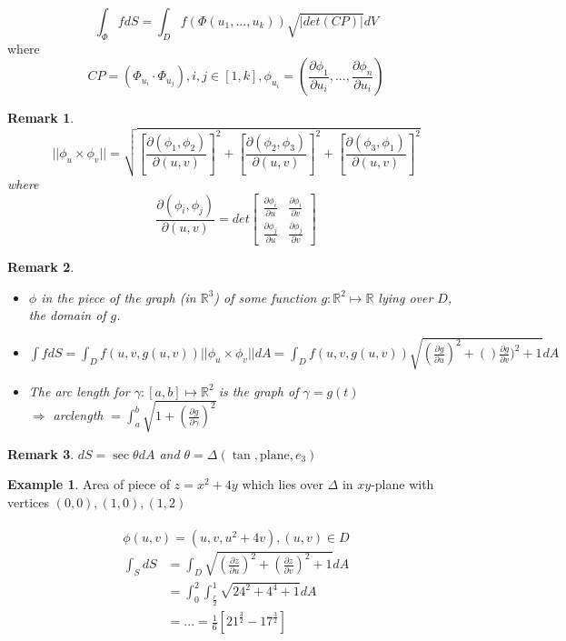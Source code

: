 \documentclass[12pt]{article}
\theoremstyle{plain}
\newtheorem*{remark}{Remark}
\theoremstyle{definition}
\newtheorem{example}[theorem]{Example}
\begin{document}
$$\int_\Phi f dS = \int_D f(\Phi (u_1,...,u_k)) \sqrt{|det(CP)|} dV$$
where
$$CP = (\Phi_{u_i} \cdot \Phi_{u_j}), i,j \in [1,k], \phi_{u_i} = (\frac{\partial \phi_1}{\partial u_i}, ..., \frac{\partial \phi_n}{\partial u_i})$$

\begin{remark}
	$$||\phi_u \times \phi_v|| = \sqrt{[\frac{\partial (\phi_1, \phi_2)}{\partial (u,v)}]^2 + [\frac{\partial (\phi_2, \phi_3)}{\partial (u,v)}]^2 + [\frac{\partial (\phi_3, \phi_1)}{\partial (u,v)}]^2}$$
	where
	$$\frac{\partial (\phi_i, \phi_j)}{\partial (u,v)} = det\begin{bmatrix}
	\frac{\partial \phi_i}{\partial u} & \frac{\partial \phi_i}{\partial v} \\
	\frac{\partial \phi_j}{\partial u} & \frac{\partial \phi_j}{\partial v}
	\end{bmatrix}$$
\end{remark}

\begin{remark}
	\begin{itemize}
		\item{$\phi$ in the piece of the graph (in $\mathbb{R}^3$) of some function $g:\mathbb{R}^2\mapsto \mathbb{R}$ lying over $D$, the domain of $g$.}
		\item{$\int f dS = \int_D f(u,v,g(u,v))||\phi_u \times \phi_v||dA = \int_D f(u,v,g(u,v)) \sqrt{(\frac{\partial g}{\partial u})^2 + ()\frac{\partial g}{\partial v})^2 + 1}dA$}
		\item{The arc length for $\gamma: [a,b] \mapsto \mathbb{R}^2$ is the graph of $\gamma=g(t)$\\
		$\Longrightarrow$ arclength $= \int^b_a \sqrt{1 + (\frac{\partial g}{\partial \gamma})^2}$}
	\end{itemize}
\end{remark}

\begin{remark}
	$dS = \sec\theta dA$ and $\theta = \Delta (\tan, \text{plane}, e_3)$
\end{remark}

\begin{example}
	Area of piece of $z=x^2+4y$ which lies over $\Delta$ in $xy$-plane with vertices $(0,0), (1,0), (1,2)$\\
	\\
	$$\phi (u,v) = (u,v,u^2 + 4v), (u,v) \in D$$
	\begin{align*}
		\int_S dS &= \int_D \sqrt{(\frac{\partial z}{\partial u})^2 + (\frac{\partial z}{\partial v})^2 + 1} dA\\
		&= \int^2_0 \int^1_{\frac{r}{2}} \sqrt{24^2 + 4^4 + 1} dA\\
		&= ... = \frac{1}{6} [21^{\frac{3}{2}} - 17^{\frac{3}{2}}]
	\end{align*}
\end{example}
\newpage
\end{document}
